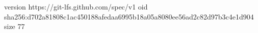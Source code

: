 version https://git-lfs.github.com/spec/v1
oid sha256:d702a81808c1ac450188afedaa6995b18a05a8080ee56ad2c82d97b3c4e1d904
size 77
